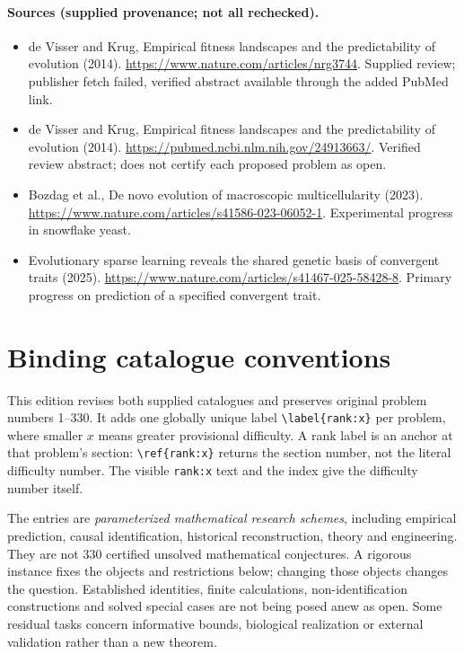 \documentclass[11pt]{article}
\begin{document}
\paragraph{Sources (supplied provenance; not all rechecked).}
\begin{itemize}
\item de Visser and Krug, Empirical fitness landscapes and the predictability of evolution (2014). \url{https://www.nature.com/articles/nrg3744}. Supplied review; publisher fetch failed, verified abstract available through the added PubMed link.
\item de Visser and Krug, Empirical fitness landscapes and the predictability of evolution (2014). \url{https://pubmed.ncbi.nlm.nih.gov/24913663/}. Verified review abstract; does not certify each proposed problem as open.
\item Bozdag et al., De novo evolution of macroscopic multicellularity (2023). \url{https://www.nature.com/articles/s41586-023-06052-1}. Experimental progress in snowflake yeast.
\item Evolutionary sparse learning reveals the shared genetic basis of convergent traits (2025). \url{https://www.nature.com/articles/s41467-025-58428-8}. Primary progress on prediction of a specified convergent trait.
\end{itemize}


\section*{Binding catalogue conventions}
This edition revises both supplied catalogues and preserves original problem numbers 1--330. It adds one globally unique label \verb|\label{rank:x}| per problem, where smaller $x$ means greater provisional difficulty. A rank label is an anchor at that problem's section: \verb|\ref{rank:x}| returns the section number, not the literal difficulty number. The visible \texttt{rank:x} text and the index give the difficulty number itself.

The entries are \emph{parameterized mathematical research schemes}, including empirical prediction, causal identification, historical reconstruction, theory and engineering. They are not 330 certified unsolved mathematical conjectures. A rigorous instance fixes the objects and restrictions below; changing those objects changes the question. Established identities, finite calculations, non-identification constructions and solved special cases are not being posed anew as open. Some residual tasks concern informative bounds, biological realization or external validation rather than a new theorem.
\end{document}
